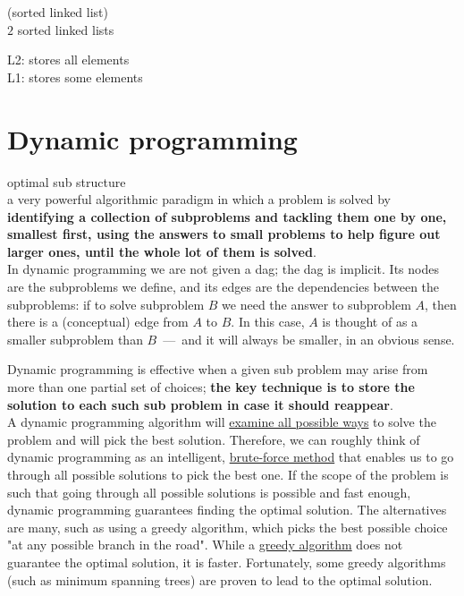 \documentclass{article}
\begin{document}
\bigskip
\noindent (sorted linked list)\\
$2$ sorted linked lists

\bigskip
\noindent L2: stores all elements\\
L1: stores some elements

\section{Dynamic programming}
optimal sub structure\\
a very powerful algorithmic paradigm in which a problem is solved by \textbf{identifying a collection of subproblems and tackling them one by one, smallest first, using the answers to small problems to help figure out larger ones, until the whole lot of them is solved}. \\
In dynamic programming we are not given a dag; the dag is implicit. Its nodes are the subproblems we define, and its edges are the dependencies between the subproblems: if to solve subproblem $B$ we need the answer to subproblem $A$, then there is a (conceptual) edge from $A$ to $B$. In this case, $A$ is thought of as a smaller subproblem than $B$\ ---\ and it will always be smaller, in an obvious sense.

Dynamic programming is effective when a given sub problem may arise from more than one partial set of choices; \textbf{the key technique is to store the solution to each such sub problem in case it should reappear}.\\
A dynamic programming algorithm will \underline{examine all possible ways} to solve the problem and will pick the best solution. Therefore, we can roughly think of dynamic programming as an intelligent, \underline{brute-force method} that enables us to go through all possible solutions to pick the best one. If the scope of the problem is such that going through all possible solutions is possible and fast enough, dynamic programming guarantees finding the optimal solution. The alternatives are many, such as using a greedy algorithm, which picks the best possible choice "at any possible branch in the road". While a \underline{greedy algorithm} does not guarantee the optimal solution, it is faster. Fortunately, some greedy algorithms (such as minimum spanning trees) are proven to lead to the optimal solution.
\end{document}
